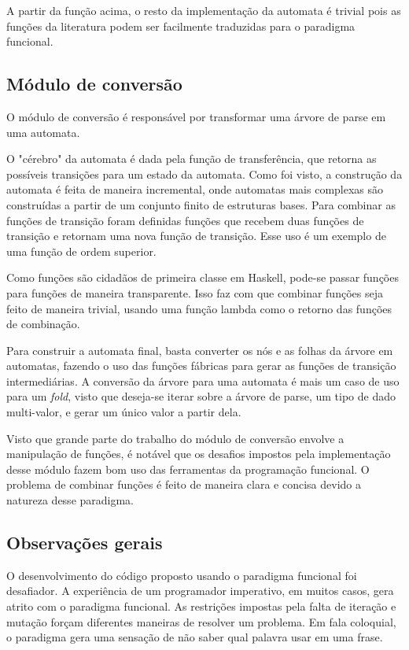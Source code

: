 A partir da função acima, o resto da implementação da automata é trivial pois as funções da literatura podem ser facilmente traduzidas para o paradigma funcional.

\subsection{Módulo de conversão}
O módulo de conversão é responsável por transformar uma árvore de parse em uma automata.

O "cérebro" da automata é dada pela função de transferência, que retorna as possíveis transições para um estado da automata.
Como foi visto, a construção da automata é feita de maneira incremental, onde automatas mais complexas são construídas a partir de um conjunto finito de estruturas bases.
Para combinar as funções de transição foram definidas funções que recebem duas funções de transição e retornam uma nova função de transição.
Esse uso é um exemplo de uma função de ordem superior.

Como funções são cidadãos de primeira classe em Haskell, pode-se passar funções para funções de maneira transparente.
Isso faz com que combinar funções seja feito de maneira trivial, usando uma função lambda como o retorno das funções de combinação.

Para construir a automata final, basta converter os nós e as folhas da árvore em automatas, fazendo o uso das funções fábricas para gerar as funções de transição intermediárias.
A conversão da árvore para uma automata é mais um caso de uso para um \emph{fold}, visto que deseja-se iterar sobre a árvore de parse, um tipo de dado multi-valor, e gerar um único valor a partir dela.

Visto que grande parte do trabalho do módulo de conversão envolve a manipulação de funções, é notável que os desafios impostos pela implementação desse módulo fazem bom uso das ferramentas da programação funcional.
O problema de combinar funções é feito de maneira clara e concisa devido a natureza desse paradigma.

\subsection{Observações gerais}

O desenvolvimento do código proposto usando o paradigma funcional foi desafiador.
A experiência de um programador imperativo, em muitos casos, gera atrito com o paradigma funcional.
As restrições impostas pela falta de iteração e mutação forçam diferentes maneiras de resolver um problema.
Em fala coloquial, o paradigma gera uma sensação de não saber qual palavra usar em uma frase.

